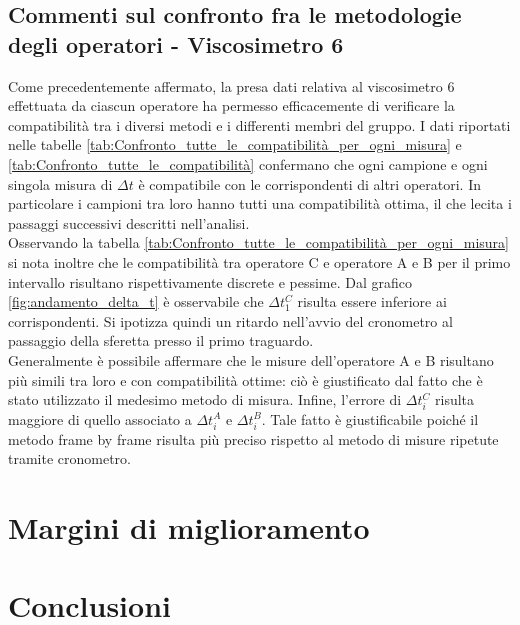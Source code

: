 \documentclass[a4paper,11pt,oneside]{article}
\begin{document}
\subsection{Commenti sul confronto fra  le metodologie degli operatori - Viscosimetro 6}
Come precedentemente affermato, la presa dati relativa al viscosimetro 6 effettuata da ciascun operatore ha permesso efficacemente di verificare la compatibilità tra i diversi metodi e i differenti membri del gruppo. I dati riportati nelle tabelle  \ref{tab:Confronto_tutte_le_compatibilità_per_ogni_misura} e  \ref{tab:Confronto_tutte_le_compatibilità} confermano che ogni campione e ogni singola misura di $\Delta t$ è compatibile con le corrispondenti di altri operatori. In particolare i campioni tra loro hanno tutti una compatibilità ottima, il che lecita i passaggi successivi descritti nell'analisi.\\
Osservando la tabella \ref{tab:Confronto_tutte_le_compatibilità_per_ogni_misura} si nota inoltre che le compatibilità tra operatore C e operatore A e B per il primo intervallo risultano rispettivamente discrete e pessime. Dal grafico \ref{fig:andamento_delta_t} è osservabile che $\Delta t^C_1$ risulta essere inferiore ai corrispondenti. Si ipotizza quindi un ritardo nell'avvio del cronometro al passaggio della sferetta presso il primo traguardo.\\
Generalmente è possibile affermare che le misure dell'operatore A e B risultano più simili tra loro e con compatibilità ottime: ciò è giustificato dal fatto che è stato utilizzato il medesimo metodo di misura.
Infine, l'errore di $\Delta t^C_i$ risulta maggiore di quello associato a $\Delta t^A_i$ e $\Delta t^B_i$. Tale fatto è giustificabile poiché il metodo frame by frame risulta più preciso rispetto al metodo di misure ripetute tramite cronometro. %


\section{Margini di miglioramento}


\section{Conclusioni}
\end{document}
